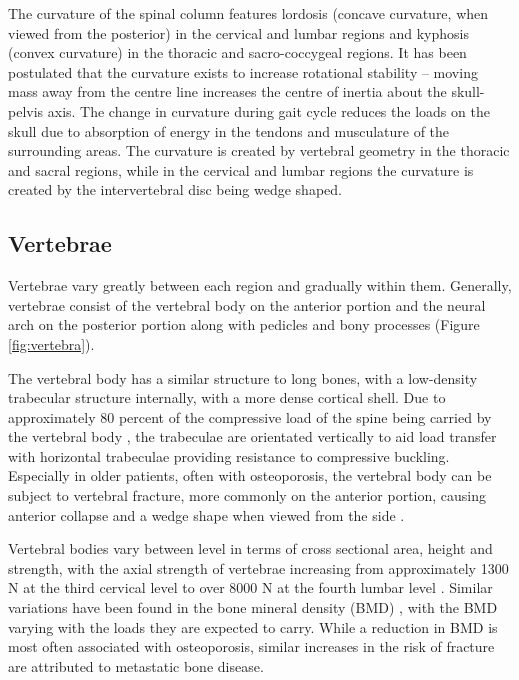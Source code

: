 The curvature of the spinal column features lordosis (concave curvature, when viewed from the posterior)
in the cervical and lumbar regions and kyphosis (convex curvature) in
the thoracic and sacro-coccygeal regions. It has been postulated that
the curvature exists to increase rotational stability -- moving mass
away from the centre line increases the centre of inertia about the
skull-pelvis axis. The change in curvature during gait cycle reduces the
loads on the skull due to absorption of energy in the tendons and
musculature of the surrounding areas. The curvature is created by
vertebral geometry in the thoracic and sacral regions, while in the
cervical and lumbar regions the curvature is created by the
intervertebral disc being wedge shaped.

\subsection{Vertebrae}\label{vertebrae}

Vertebrae vary greatly between each region and gradually within them.
Generally, vertebrae consist of the vertebral body on the anterior portion and the neural arch on the posterior portion along with pedicles and bony processes (Figure \ref{fig:vertebra}).

The vertebral body has a similar structure to long bones, with a
low-density trabecular structure internally, with a more dense cortical
shell. Due to approximately 80 percent of the compressive load of the
spine being carried by the vertebral body \cite{Adams2005}, the trabeculae are orientated
vertically to aid load transfer with horizontal trabeculae providing
resistance to compressive buckling. Especially in older patients, often
with osteoporosis, the vertebral body can be subject to vertebral
fracture, more commonly on the anterior portion, causing anterior collapse and a wedge shape when viewed from the side \cite{Adams2005}.

Vertebral bodies vary between level in terms of cross sectional area,
height and strength, with the axial strength of vertebrae increasing
from approximately 1300 N at the third cervical level to over 8000 N at the fourth lumbar level \cite{Stewart2006}. Similar variations have been found in the bone mineral density (BMD) \cite{yoganandan2006}, with the BMD varying
with the loads they are expected to carry. While a reduction in BMD is most often associated with osteoporosis, similar increases in the risk of fracture are attributed to metastatic bone disease.

